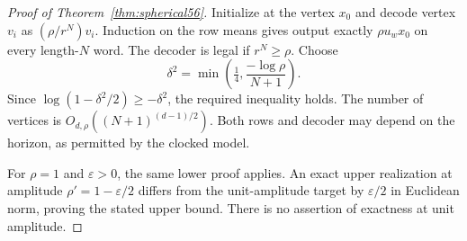 \begin{proof}[Proof of Theorem~\ref{thm:spherical56}]
Initialize at the vertex $x_0$ and decode vertex $v_i$ as $(\rho/r^N)v_i$. Induction on the row means gives output exactly $\rho u_wx_0$ on every length-$N$ word. The decoder is legal if $r^N\ge\rho$. Choose
\[
                 \delta^2=\min\left(\tfrac14,
                                      \frac{-\log\rho}{N+1}\right).
\]
Since $\log(1-\delta^2/2)\ge-\delta^2$, the required inequality holds. The number of vertices is $O_{d,\rho}((N+1)^{(d-1)/2})$. Both rows and decoder may depend on the horizon, as permitted by the clocked model.

For $\rho=1$ and $\varepsilon>0$, the same lower proof applies. An exact upper realization at amplitude $\rho'=1-\varepsilon/2$ differs from the unit-amplitude target by $\varepsilon/2$ in Euclidean norm, proving the stated upper bound. There is no assertion of exactness at unit amplitude.
\end{proof}

